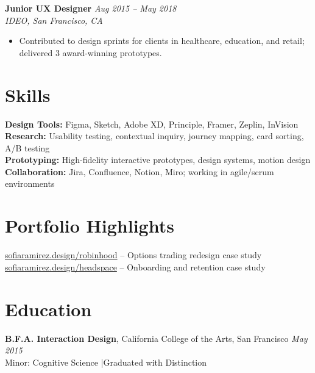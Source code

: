 \documentclass[11pt,a4paper]{article}
\begin{document}
\vspace{4pt}
\noindent\textbf{Junior UX Designer} \hfill \textit{Aug 2015 -- May 2018}\\
\textit{IDEO, San Francisco, CA}
\begin{itemize}
  \item Contributed to design sprints for clients in healthcare, education, and retail; delivered 3 award-winning prototypes.
\end{itemize}

\section{Skills}
\textbf{Design Tools:} Figma, Sketch, Adobe XD, Principle, Framer, Zeplin, InVision\\
\textbf{Research:} Usability testing, contextual inquiry, journey mapping, card sorting, A/B testing\\
\textbf{Prototyping:} High-fidelity interactive prototypes, design systems, motion design\\
\textbf{Collaboration:} Jira, Confluence, Notion, Miro; working in agile/scrum environments

\section{Portfolio Highlights}
\href{https://sofiaramirez.design/robinhood}{sofiaramirez.design/robinhood} -- Options trading redesign case study\\
\href{https://sofiaramirez.design/headspace}{sofiaramirez.design/headspace} -- Onboarding and retention case study

\section{Education}
\textbf{B.F.A. Interaction Design}, California College of the Arts, San Francisco \hfill \textit{May 2015}\\
Minor: Cognitive Science \quad|\quad Graduated with Distinction
\end{document}
